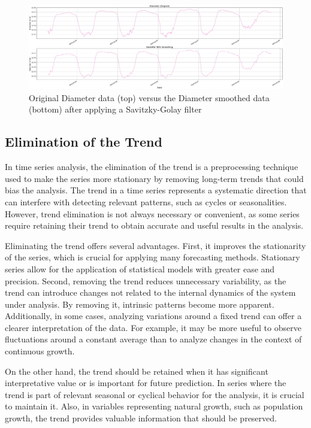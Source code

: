 \begin{figure}[htbp]
    \centering
    \includegraphics[width=15 cm]{5_ChapterDesign/figuras/2_Smoothing/Smoothing_Diameter}
    \caption{Original Diameter data (top) versus the Diameter smoothed data (bottom) after applying a Savitzky-Golay filter}
    \label{Smoothing_Diameter}
\end{figure}

\subsection{Elimination of the Trend}

In time series analysis, the elimination of the trend is a preprocessing technique used to make the series more stationary by removing long-term trends that could bias the analysis. The trend in a time series represents a systematic direction that can interfere with detecting relevant patterns, such as cycles or seasonalities. However, trend elimination is not always necessary or convenient, as some series require retaining their trend to obtain accurate and useful results in the analysis.

Eliminating the trend offers several advantages. First, it improves the stationarity of the series, which is crucial for applying many forecasting methods. Stationary series allow for the application of statistical models with greater ease and precision. Second, removing the trend reduces unnecessary variability, as the trend can introduce changes not related to the internal dynamics of the system under analysis. By removing it, intrinsic patterns become more apparent. Additionally, in some cases, analyzing variations around a fixed trend can offer a clearer interpretation of the data. For example, it may be more useful to observe fluctuations around a constant average than to analyze changes in the context of continuous growth.

On the other hand, the trend should be retained when it has significant interpretative value or is important for future prediction. In series where the trend is part of relevant seasonal or cyclical behavior for the analysis, it is crucial to maintain it. Also, in variables representing natural growth, such as population growth, the trend provides valuable information that should be preserved.

